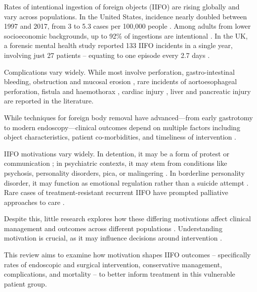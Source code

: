 \documentclass[pdflatex,sn-basic,Numbered]{sn-jnl}
\begin{document}
Rates of intentional ingestion of foreign objects (IIFO) are rising globally and vary across populations. In the United States, incidence nearly doubled between 1997 and 2017, from 3 to 5.3 cases per 100,000 people \cite{Hsieh_2020}. Among adults from lower socioeconomic backgrounds, up to 92\% of ingestions are intentional \cite{Hsieh_2020, Palta_2009}. In the UK, a forensic mental health study reported 133 IIFO incidents in a single year, involving just 27 patients -- equating to one episode every 2.7 days \cite{Tromans_2019}.

Complications vary widely. While most involve perforation, gastro-intestinal bleeding, obstruction and mucosal erosion \cite{Ikenberry_2011}, rare incidents of aortoesophageal perforation, fistula and haemothorax \cite{Hunt_2007f}, cardiac injury \cite{Udemgba_2021f}, liver \cite{Zhao_2022e} and pancreatic injury \cite{Bozorgmehr_2022f} are reported in the literature.

While techniques for foreign body removal have advanced—from early gastrotomy to modern endoscopy—clinical outcomes depend on multiple factors including object characteristics, patient co-morbidities, and timeliness of intervention \cite{Moehlau_1895, Saint_1929, Barros_1991, Lerche_1911, Jackson_1957, Ricote_1985, Chalk_1928, Ikenberry_2011}.

IIFO motivations vary widely. In detention, it may be a form of protest or communication \cite{Puggioni_2014,Losanoff_1997e}; in psychiatric contexts, it may stem from conditions like psychosis, personality disorders, pica, or malingering \cite{Gitlin_2007, Poynter_2011, Tromans_2019, Al-Faham_2020k, Pantazopoulos_2022, Aitchison_2024, Losanoff_1997e}. In borderline personality disorder, it may function as emotional regulation rather than a suicide attempt \cite{Gitlin_2007}. Rare cases of treatment-resistant recurrent IIFO have prompted palliative approaches to care \cite{Jaini_2023}.

Despite this, little research explores how these differing motivations affect clinical management and outcomes across different populations \cite{Bhugra_2010, Haase_2022, Hedrick_2023a}. Understanding motivation is crucial, as it may influence decisions around intervention \cite{Ataya_2013, Albeldawi_2014}.

This review aims to examine how motivation shapes IIFO outcomes -- specifically rates of endoscopic and surgical intervention, conservative management, complications, and mortality -- to better inform treatment in this vulnerable patient group. 
\end{document}
